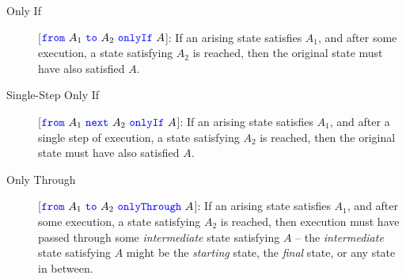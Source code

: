 \begin{description}
\item[Only If]
[${\color{blue}\texttt{from}}\ A_1\ {\color{blue}\texttt{to}}\ A_2\ {\color{blue}\texttt{onlyIf}}\ A$]: If an arising %
  state satisfies $A_1$, and after some execution, a state %
 satisfying $A_2$ is reached, 
then the original  
state must have also satisfied $A$.
\item[Single-Step Only If]
[${\color{blue}\texttt{from}}\ A_1\ {\color{blue}\texttt{next}}\ A_2\ {\color{blue}\texttt{onlyIf}}\ A$]: If an arising %
  state satisfies $A_1$, and after a single step of execution, a state satisfying $A_2$ is reached, 
then the original %
state must have also satisfied $A$.

\item[Only Through]
[${\color{blue}\texttt{from}}\ A_1\ {\color{blue}\texttt{to}}\ A_2\ {\color{blue}\texttt{onlyThrough}}\ A$]: If an arising %
 state satisfies $A_1$, and after some execution, a state satisfying $A_2$ is reached, then  execution must have passed through some \emph{intermediate} state satisfying $A$ 
--  the   \emph{intermediate} state %
satisfying $A$ might be the \emph{starting}  
state, the \emph{final} state, or any state in between.
\end{description}


